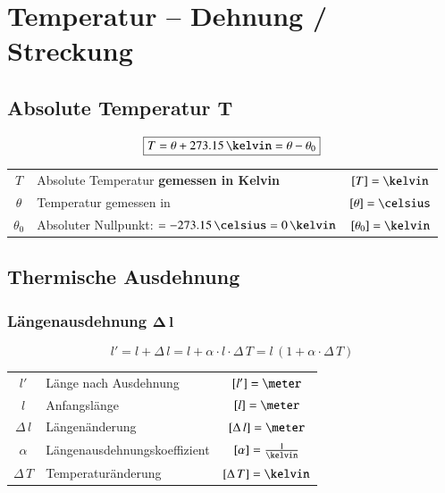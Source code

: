 \section{Temperatur -- Dehnung / Streckung}

\subsection[Absolute Temperatur]{Absolute Temperatur $\bm{T}$}

\vspace{-0.2cm}

$$ \boxed{ T = \theta + 273.15 \, \kelvin = \theta - \theta_0 } $$

\begin{tabular}{c l c}
		$T$ 		& Absolute Temperatur \textbf{gemessen in Kelvin}				& $[T] =\kelvin$  		\\
		$\theta$ 	& Temperatur gemessen in \celsius 								& $[\theta] = \celsius$ \\
		$\theta_0$ 	& Absoluter Nullpunkt: $= -273.15 \, \celsius = 0 \, \kelvin$	& $[\theta_0] = \kelvin$
\end{tabular}


\subsection{Thermische Ausdehnung}

\subsubsection{Längenausdehnung $\bm{\Delta \, l}$}

\vspace{-0.2cm}

$$ \boxed{ l' = l + \Delta \, l = l + \alpha \cdot l \cdot \Delta \, T = l \, (1 + \alpha \cdot \Delta \, T ) } $$


\begin{tabular}{c l c}
		$l'$ 			& Länge nach Ausdehnung 		& 
 $[l'] = \meter$ 					\\
		$l$ 			& Anfangslänge 					& $[l] = \meter$ 					\\
		$\Delta \, l$ 	& Längenänderung 				& $[\Delta \, l] = \meter$ 			\\
		$\alpha$ 		& Längenausdehnungskoeffizient 	& $[\alpha] = \frac{1}{\kelvin}$ 	\\ 
		$\Delta \, T $ 	& Temperaturänderung 			& $[\Delta \, T ] = \kelvin$
\end{tabular}


